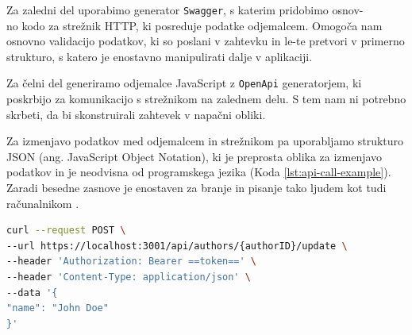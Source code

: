 \documentclass[a4paper, 12pt]{book}
\begin{document}
Za zaledni del uporabimo generator \verb=Swagger=, s katerim pridobimo osnov-\\no kodo za strežnik HTTP, ki posreduje podatke odjemalcem. Omogoča nam osnovno validacijo podatkov, ki so poslani v zahtevku in le-te pretvori v primerno strukturo, s katero je enostavno manipulirati dalje v aplikaciji.

Za čelni del generiramo odjemalce JavaScript z \verb=OpenApi= generatorjem, ki poskrbijo za komunikacijo s strežnikom na zalednem delu. S tem nam ni potrebno skrbeti, da bi skonstruirali zahtevek v napačni obliki.

Za izmenjavo podatkov med odjemalcem in strežnikom pa uporabljamo strukturo JSON (ang. JavaScript Object Notation), ki je preprosta oblika za izmenjavo podatkov in je neodvisna od programskega jezika (Koda \ref{lst:api-call-example}). Zaradi besedne zasnove je enostaven za branje in pisanje tako ljudem kot tudi računalnikom \cite{json-rfc}.

\clearpage

\begin{lstlisting}[language=bash, style=mystyle,caption={Primer izvedbe API klica.},label=lst:api-call-example]
curl --request POST \
--url https://localhost:3001/api/authors/{authorID}/update \
--header 'Authorization: Bearer ==token==' \
--header 'Content-Type: application/json' \
--data '{
"name": "John Doe"
}'
\end{lstlisting}
\end{document}
